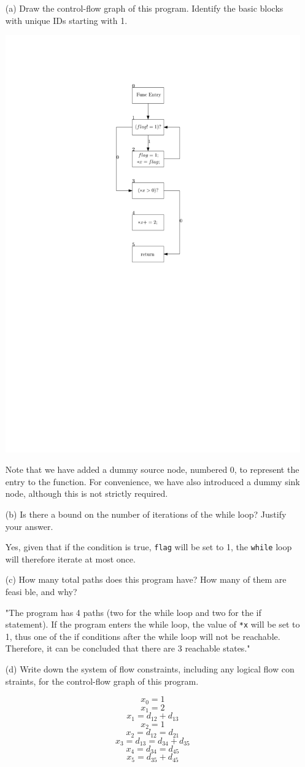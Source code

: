 \documentclass[12pt]{article}
\begin{document}
\begin{enumerate}
	\item [(a)]
	Draw the control-flow graph of this program. Identify the basic blocks with
	unique IDs starting with 1.
	\begin{qsolve}
		\begin{center}
			\includegraphics*[width=0.2\linewidth]{images/Q2.pdf}
		\end{center}
	\end{qsolve}
	
	Note that we have added a dummy source node, numbered 0, to represent the
	entry to the function. For convenience, we have also introduced a dummy sink
	node, although this is not strictly required.
	
	\item [(b)]
	Is there a bound on the number of iterations of the while loop? Justify your
	answer.
	\begin{qsolve}
		Yes, given that if the condition is true, \texttt{flag} will be set to 1, the \texttt{while} loop will therefore iterate at most once.
	\end{qsolve}
	
	
	\item [(c)]
	How many total paths does this program have? How many of them are feasi
	ble, and why?
	\begin{qsolve}
		"The program has 4 paths (two for the while loop and two for the if statement). If the program enters the while loop, the value of \texttt{*x} will be set to 1, thus one of the if conditions after the while loop will not be reachable. Therefore, it can be concluded that there are 3 reachable states."
	\end{qsolve}
	
	
	\item [(d)]
	Write down the system of flow constraints, including any logical flow con
	straints, for the control-flow graph of this program.
	\begin{qsolve}
			$$ x_0 = 1 $$
			$$x_1 = 2$$
			$$x_1 = d_{12} + d_{13}$$
			$$x_2 = 1$$
			$$x_2 = d_{12} = d_{21}$$
			$$x_3 = d_{13} = d_{34} + d_{35}$$
			$$x_4 = d_{34} = d_{45}$$
			$$x_5 = d_{35} + d_{45}$$
	\end{qsolve}
	

\end{enumerate}
\end{document}
